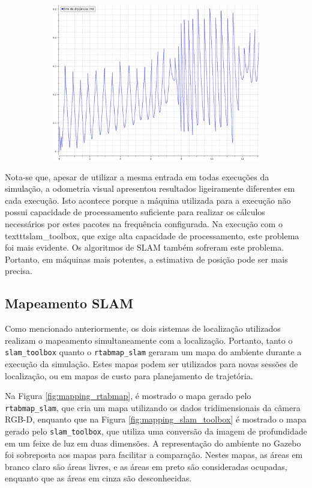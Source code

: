\documentclass[repeatfields,xlists,xpacks,oneside,yearsonly]{ufrgscca}
\begin{document}
\begin{figure}[h]
\begin{subfigure}{0.5\linewidth}
{            \includegraphics[width=0.98\linewidth]{localization-slam-toolbox-error.png}\\
        }
    \end{subfigure}
\end{figure}

Nota-se que, apesar de utilizar a mesma entrada em todas execuções da
simulação, a odometria visual apresentou resultados ligeiramente
diferentes em cada execução. Isto acontece porque a máquina utilizada
para a execução não possui capacidade de processamento suficiente
para realizar os cálculos necessários por estes pacotes na frequência
configurada. Na execução com o texttt{slam\_toolbox}, que exige alta
capacidade de processamento, este problema foi mais evidente. Os
algoritmos de SLAM também sofreram este problema. Portanto, em
máquinas mais potentes, a estimativa de posição pode ser mais
precisa.

\subsection{Mapeamento SLAM}

Como mencionado anteriormente, os dois sistemas de localização
utilizados realizam o mapeamento simultaneamente com a localização.
Portanto, tanto o \texttt{slam\_toolbox} quanto o
\texttt{rtabmap\_slam} geraram um mapa do ambiente durante a execução
da simulação. Estes mapas podem ser utilizados para novas sessões de
localização, ou em mapas de custo para planejamento de trajetória.

Na Figura \ref{fig:mapping_rtabmap}, é mostrado o mapa gerado pelo
\texttt{rtabmap\_slam}, que cria um mapa utilizando os dados
tridimensionais da câmera RGB-D, enquanto que na Figura
\ref{fig:mapping_slam_toolbox} é mostrado o mapa gerado pelo
\texttt{slam\_toolbox}, que utiliza uma conversão da imagem de
profundidade em um feixe de luz em duas dimensões. A representação do
ambiente no Gazebo foi sobreposta aos mapas para facilitar a
comparação. Nestes mapas, as áreas em branco claro são áreas livres,
e as áreas em preto são consideradas ocupadas, enquanto que as áreas
em cinza são desconhecidas.
\end{document}
